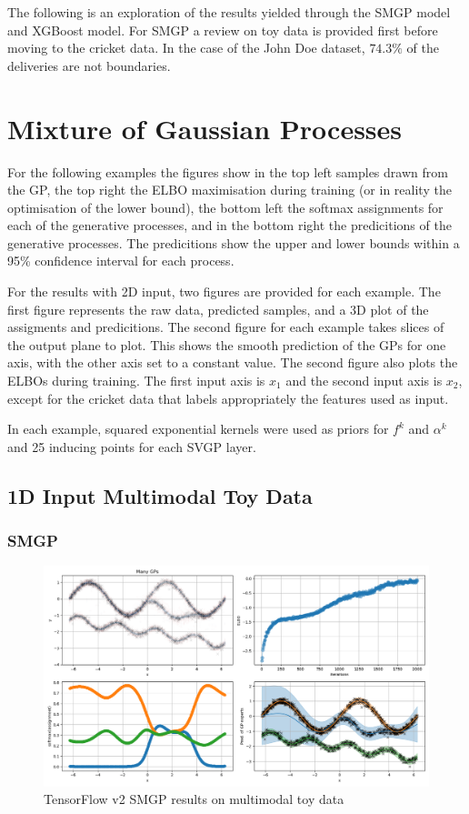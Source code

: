 \documentclass[12pt,a4paper]{report}
\theoremstyle{definition}
\begin{document}
The following is an exploration of the results yielded through the SMGP model and XGBoost model.
For SMGP a review on toy data is provided first before moving to the cricket data.
In the case of the John Doe dataset, $74.3\%$ of the deliveries are not boundaries.

\section{Mixture of Gaussian Processes}

For the following examples the figures show in the top left samples drawn from the GP, the top right the ELBO maximisation during training (or in reality the optimisation of the lower bound), the bottom left the softmax assignments for each of the generative processes, and in the bottom right the predicitions of the generative processes.
The predicitions show the upper and lower bounds within a 95\% confidence interval for each process. 

For the results with 2D input, two figures are provided for each example.
The first figure represents the raw data, predicted samples, and a 3D plot of the assigments and predicitions.
The second figure for each example takes slices of the output plane to plot.
This shows the smooth prediction of the GPs for one axis, with the other axis set to a constant value.
The second figure also plots the ELBOs during training.
The first input axis is $x_{1}$ and the second input axis is $x_{2}$, except for the cricket data that labels appropriately the features used as input.

In each example, squared exponential kernels were used as priors for $f^k$ and $\alpha^k$ and 25 inducing points for each SVGP layer.  

\subsection{1D Input Multimodal Toy Data}

\subsubsection{SMGP}

\begin{figure}[H]
    \centering
    \includegraphics[width=\linewidth]{demo_tf2.png}
    \caption{TensorFlow v2 SMGP results on multimodal toy data}
    \label{fig:MultimodalSMGP}
\end{figure}
\end{document}
